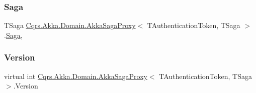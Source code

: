 \subsubsection{\texorpdfstring{Saga}{Saga}}
{\footnotesize\ttfamily T\+Saga \hyperlink{classCqrs_1_1Akka_1_1Domain_1_1AkkaSagaProxy}{Cqrs.\+Akka.\+Domain.\+Akka\+Saga\+Proxy}$<$ T\+Authentication\+Token, T\+Saga $>$.\hyperlink{classCqrs_1_1Domain_1_1Saga}{Saga}\hspace{0.3cm}{\ttfamily [get]}, {}}

\mbox{\label{classCqrs_1_1Akka_1_1Domain_1_1AkkaSagaProxy_ab6272400fe5c6227a11cf5c93f752d4d}} 
\subsubsection{\texorpdfstring{Version}{Version}}
{\footnotesize\ttfamily virtual int \hyperlink{classCqrs_1_1Akka_1_1Domain_1_1AkkaSagaProxy}{Cqrs.\+Akka.\+Domain.\+Akka\+Saga\+Proxy}$<$ T\+Authentication\+Token, T\+Saga $>$.Version\hspace{0.3cm}{\ttfamily [get]}}

